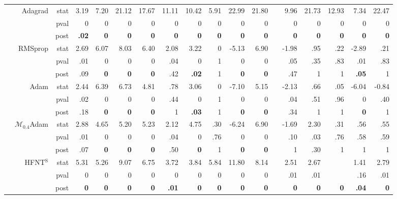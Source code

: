 \documentclass[11pt,a4paper]{article}
\begin{document}
\begin{table}
\begin{tabular}[t]{lrrrrrrrrrrrrrrrrr}
& Adagrad & stat & 3.19 & 7.20 & 21.12 & 17.67 & 11.11 & 10.42 & 5.91 & 22.99 & 21.80 &  & 9.96 & 21.73 & 12.93 & 7.34 & 22.47 \\
            &  & pval & 0 & 0 & 0 & 0 & 0 & 0 & 0 & 0 & 0 &  & 0 & 0 & 0 & 0 & 0 \\
            &  & post & \textbf{.02} & \textbf{0} & \textbf{0} & \textbf{0} & \textbf{0} & \textbf{0} & \textbf{0} & \textbf{0} & \textbf{0} &  & \textbf{0} & \textbf{0} & \textbf{0} & \textbf{0} & \textbf{0} \\
& RMSprop & stat & 2.69 & 6.07 & 8.03 & 6.40 & 2.08 & 3.22 & 0 & -5.13 & 6.90 &  & -1.98 & .95 & .22 & -2.89 & .21 \\
            &  & pval & .01 & 0 & 0 & 0 & .04 & 0 & 1 & 0 & 0 &  & .05 & .35 & .83 & .01 & .83 \\
            &  & post & .09 & \textbf{0} & \textbf{0} & \textbf{0} & .42 & \textbf{.02} & 1 & \textbf{0} & \textbf{0} &  & .47 & 1 & 1 & \textbf{.05} & 1 \\
& Adam & stat & 2.44 & 6.39 & 6.73 & 4.81 & .78 & 3.06 & 0 & -7.10 & 5.15 &  & -2.13 & .66 & .05 & -6.04 & -0.84 \\
            &  & pval & .02 & 0 & 0 & 0 & .44 & 0 & 1 & 0 & 0 &  & .04 & .51 & .96 & 0 & .40 \\
            &  & post & .18 & \textbf{0} & \textbf{0} & \textbf{0} & 1 & \textbf{.03} & 1 & \textbf{0} & \textbf{0} &  & .34 & 1 & 1 & \textbf{0} & 1 \\
&$\mathcal{M}_{0.4}$Adam & stat & 2.88 & 4.65 & 5.20 & 5.23 & 2.12 & 4.75 & .30 & -6.24 & 6.90 &  & -1.69 & 2.30 & .31 & .56 & .55  \\ 
            & & pval & .01 & 0 & 0 & 0 & .04 & 0 & .76 & 0 & 0 &  & .10 & .03 & .76 & .58 & .59  \\ 
            & & post & .07 & \textbf{0} & \textbf{0} & \textbf{0} & .50 & \textbf{0} & 1 & \textbf{0} & \textbf{0} &  & 1 & .30 & 1 & 1 & 1  \\ 
            \cmidrule{1-2}
            \parbox[t]{3mm}{}
            &HFNT$^{\text{S}}$ & stat & 5.31 & 5.26 & 9.07 & 6.75 & 3.72 & 3.84 & 5.84 & 11.80 & 8.14 &  & 2.51 & 2.67 &  & 1.41 & 2.79 \\
            & & pval & 0 & 0 & 0 & 0 & 0 & 0 & 0 & 0 & 0 &  & .01 & .01 &  & .16 & .01 \\
            & & post & \textbf{0} & \textbf{0} & \textbf{0} & \textbf{0} & \textbf{.01} & \textbf{0} & \textbf{0} & \textbf{0} & \textbf{0} &  & \textbf{0} & \textbf{0} & \textbf{0} & \textbf{.04} & \textbf{0} \\            

\end{tabular}
\end{table}
\end{document}
